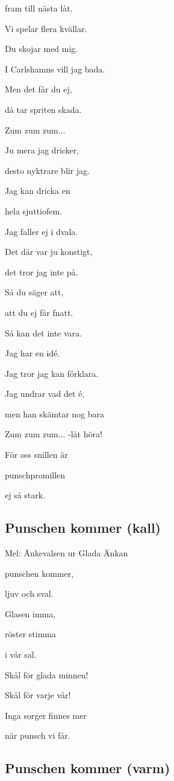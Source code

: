 fram till nästa låt.

Vi spelar flera kvällar.\bigskip

Du skojar med mig.

I Carlshamns vill jag bada.

Men det får du ej,

då tar spriten skada.\bigskip

Zum zum zum...\bigskip

Ju mera jag dricker,

desto nyktrare blir jag.

Jag kan dricka en

hela sjuttiofem.

Jag faller ej i dvala.\bigskip

Det där var ju konstigt,

det tror jag inte på.

Så du säger att,

att du ej får fnatt.

Så kan det inte vara.\bigskip

Jag har en idé.

Jag tror jag kan förklara.

Jag undrar vad det é,

men han skämtar nog bara\bigskip

Zum zum zum... -låt höra!\bigskip

För oss snillen är

punschpromillen

ej så stark.\bigskip


\subsection{\textbf{Punschen kommer (kall)}}

Mel: Änkevalsen ur Glada Änkan\bigskip

punschen kommer,

ljuv och sval.

Glasen imma,

röster stimma

i vår sal.

Skål för glada minnen!

Skål för varje vår!

Inga sorger finnes mer

när punsch vi får.

\subsection{\textbf{Punschen kommer (varm)}}

